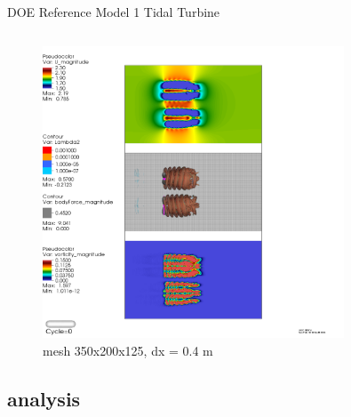 \documentclass[xcolor=x11names,compress]{beamer}
\begin{document}
\begin{frame}{DOE Reference Model 1 Tidal Turbine}
\begin{columns}
\begin{column}{0.6\textwidth}
		    \end{column}

		\end{columns}

	\end{frame}

	\begin{frame}{}

		\begin{figure}[p]
		    \centering
    		\includegraphics[width=0.8\textwidth]{figures/fastFlume__dual-rotor-mesh=medium-3vars.png}
		    \caption{\scriptsize{mesh 350x200x125, dx = 0.4 m}}
		\end{figure}

	\end{frame}

\subsection{analysis}
	
\end{document}
